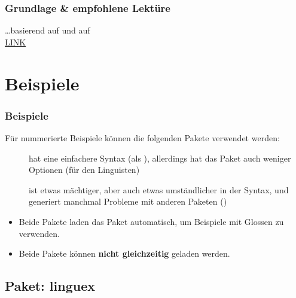 \begin{frame}
\frametitle{Grundlage \& empfohlene Lektüre}

\dots basierend auf \citet{Freitag&MyP15a} und auf \citet{MyP&Kerkhof16a}\\
\ras \href{https://www.researchgate.net/publication/279514740_LATEX-Einfuhrung_fur_Linguisten}{LINK}

\end{frame}


\section{Beispiele}

\begin{frame}[fragile]

\frametitle{Beispiele}

Für nummerierte Beispiele können die folgenden Pakete verwendet werden:

\begin{description}
	
	\item[] hat eine einfachere Syntax (als ), allerdings hat das Paket auch weniger Optionen (für den  Linguisten)
	
	\item[] ist etwas mächtiger, aber auch etwas umständlicher in der Syntax, und generiert manchmal Probleme mit anderen Paketen (\zB {}) 
\end{description}

\begin{itemize}
	\item Beide Pakete laden das Paket  automatisch, um Beispiele mit Glossen zu verwenden.

	\item Beide Pakete können \textbf{nicht gleichzeitig} geladen werden. 
\end{itemize}

\end{frame}


\subsection{Paket: linguex}

